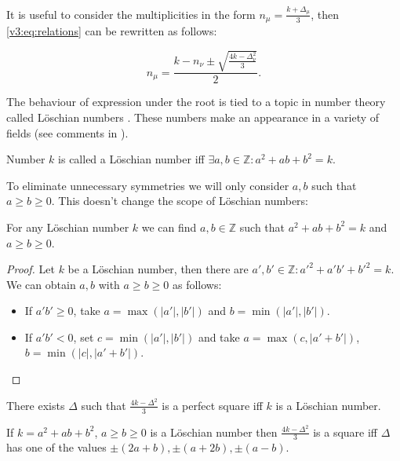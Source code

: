 It is useful to consider the multiplicities in the form $n_\mu = \frac{k+\Delta_\mu}{3}$, then \eqref{v3:eq:relations} can be rewritten as follows:

\begin{equation}
	\label{v3:eq:relations_delta}
	n_{\mu} = \frac{k-n_\nu \pm \sqrt{\frac{4k-\Delta_\nu^2}{3}}}{2}.
\end{equation}

The behaviour of expression under the root is tied to a topic in number theory called Löschian numbers \cite{oeisA003136}. These numbers make an appearance in a variety of fields (see comments in \cite{oeisA003136}).

\begin{definition}
	\label{v3:def:loeschian}
	Number $k$ is called a Löschian number iff $\exists a,b \in \mathbb Z \colon a^2+ab+b^2=k$.
\end{definition}

To eliminate unnecessary symmetries we will only consider $a,b$ such that $a \geq b \geq 0$. This doesn't change the scope of Löschian numbers:

\begin{lemma}
	\label{v3:lemma:loeschian}
	For any Löschian number $k$ we can find $a,b \in \mathbb Z$ such that $a^2+ab+b^2=k$ and $a \geq b \geq 0$.
\end{lemma}

\begin{proof}
	Let $k$ be a Löschian number, then there are $a',b'\in\mathbb Z\colon a'^2+a'b'+b'^2=k$. We can obtain $a,b$ with $a \geq b \geq 0$ as follows:
	\begin{itemize}
		\item If $a'b' \geq 0$, take $a=\max(|a'|,|b'|)$ and $b=\min(|a'|,|b'|)$.
		\item If $a'b'<0$, set $c = \min(|a'|, |b'|)$ and take $a=\max(c,|a'+b'|)$, $b=\min(|c|, |a'+b'|)$.
	\end{itemize}
\end{proof}

\begin{lemma}
	\label{v3:lemma:square}
	There exists $\Delta$ such that $\frac{4k-\Delta^2}{3}$ is a perfect square iff $k$ is a Löschian number.
	
	If $k=a^2+ab+b^2$, $a \geq b \geq 0$ is a Löschian number then $\frac{4k-\Delta^2}{3}$ is a square iff $\Delta$ has one of the values $\pm (2a+b), \pm (a+2b), \pm (a-b)$.
\end{lemma}

